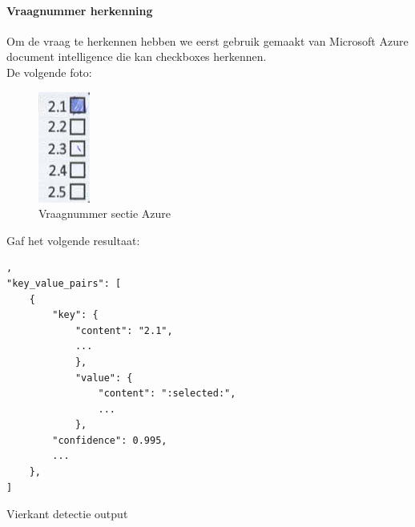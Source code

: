 \documentclass[12pt]{article}
\begin{document}
\pagebreak
\begin{multicols}{2}
\paragraph*{Vraagnummer herkenning} Om de vraag te herkennen hebben we eerst gebruik gemaakt van Microsoft Azure document intelligence die kan checkboxes herkennen.\\
De volgende foto:
\begin{figure}[H]
    \centering
    \includegraphics[width=0.2\linewidth]{./images/methoden/inscannen/sectie/checkbox/vraagnummer/answer_section.png}
    \caption{Vraagnummer sectie Azure}
    \label{fig:enter-label}
\end{figure}
Gaf het volgende resultaat: 
\begin{listing}[H]
\begin{verbatim},
"key_value_pairs": [
    {
        "key": {
            "content": "2.1",
            ...
            },
            "value": {
                "content": ":selected:",
                ...
            },
        "confidence": 0.995,
        ...
    },
]
\end{verbatim}
\caption{Vierkant detectie output} 
\label{json-example}
\end{listing}


\end{multicols}
\end{document}
